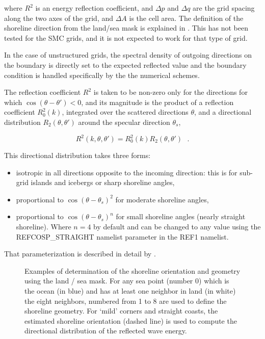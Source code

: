 \noindent
where $R^2$ is an energy reflection coefficient, and $\Delta p$ and $\Delta q$
are the grid spacing along the two axes of the grid, and $\Delta A$ is the
cell area. The definition of the shoreline direction from the land/sea mask is
explained in \cite{art:Aea11}. This has not been tested for the SMC grids, and
it is not expected to work for that type of grid.

In the case of unstructured grids, the spectral density of outgoing directions
on the boundary is directly set to the expected reflected value and the
boundary condition is handled specifically by the the numerical schemes.


The reflection coefficient $R^2$ is taken to be non-zero only for the
directions for which $\cos(\theta-\theta')<0$, and its magnitude is the
product of a reflection coefficient $R_0^2(k)$, integrated over the scattered
directions $\theta$, and a directional distribution $R_2(\theta,\theta')$
around the specular direction $\theta_s$,

\begin{equation} 
R^2(k,\theta,\theta')  =  R_0^2(k) R_2(\theta,\theta') \:\:\: .
\end{equation}

\noindent
This directional distribution takes three forms: 
\begin{itemize}

\item isotropic in all directions opposite to the incoming direction: this is
      for sub-grid islands and icebergs or sharp shoreline angles, 

\item proportional to $\cos(\theta-\theta_s)^2$ for moderate shoreline angles,

\item proportional to $\cos(\theta-\theta_s)^n$ for small shoreline angles
      (nearly straight shoreline). Where $n=4$ by default and can be changed
      to any value using the {\code REFCOSP\_STRAIGHT} namelist parameter in
      the {\code REF1} namelist.

\end{itemize}

\noindent
That parameterization is described in detail by \cite{art:AR12}.

\begin{figure} \begin{center}
\caption{Examples of determination of the shoreline orientation and geometry
  using the land / sea mask. For any sea point (number 0) which is the ocean
  (in blue) and has at least one neighbor in land (in white) the eight
  neighbors, numbered from 1 to 8 are used to define the shoreline geometry.
  For `mild' corners and straight coasts, the estimated shoreline orientation
  (dashed line) is used to compute the directional distribution of the
  reflected wave energy.  }
\label{fig:refl} \botline
\end{center}
\end{figure}

